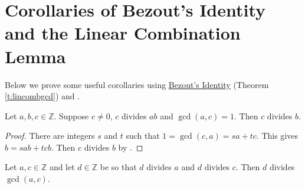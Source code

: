 \documentclass[11pt,dvipsnames]{book}
\def\Z{\mathbb{Z}}
\numberwithin{figure}{section} %
\numberwithin{table}{section} %
\begin{document}

%


\section{Corollaries of Bezout's Identity and the Linear Combination Lemma}%
\label{bezoutcorollaries}

Below we prove some useful corollaries using  \hyperref[t:lincombgcd]{ Bezout's Identity} (Theorem \ref{t:lincombgcd}) and \easylemma.

 \begin{corollary}
 \label{c:c|abc|b}
 Let $a,b,c\in\Z$. Suppose $c\neq
0$, $c$ divides $ab$ and $\gcd(a,c)=1$. Then $c$ divides $b$.
\end{corollary}

\begin{proof}
There are integers $s$ and $t$ such that $1=\gcd(c,a)=sa+tc$. This gives $b=sab+tcb$.  Then $c$ divides $b$ by \easylemma .
 \end{proof}

\begin{corollary} Let $a,c\in\Z$ and let $d\in\mathbb{Z}$ be so that $d$ divides $a$ and $d$ divides $c$.  Then $d$ divides $\gcd(a,c)$.
\end{corollary}
\end{document}
